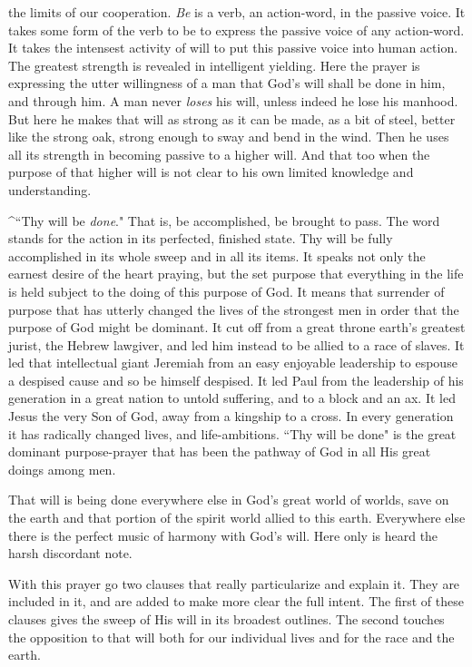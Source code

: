 the limits of our cooperation. \textit{Be} is a verb, an action-word, in the
passive voice. It takes some form of the verb to be to express the
passive voice of any action-word. It takes the intensest activity of will
to put this passive voice into human action. The greatest strength is
revealed in intelligent yielding. Here the prayer is expressing the utter
willingness of a man that God's will shall be done in him, and through
him. A man never \textit{loses} his will, unless indeed he lose his manhood. But
here he makes that will as strong as it can be made, as a bit of steel,
better like the strong oak, strong enough to sway and bend in the wind.
Then he uses all its strength in becoming passive to a higher will. And
that too when the purpose of that higher will is not clear to his own
limited knowledge and understanding.

^``Thy will be \textit{done}." That is, be accomplished, be brought to pass. The
word stands for the action in its perfected, finished state. Thy will be
fully accomplished in its whole sweep and in all its items. It speaks not
only the earnest desire of the heart praying, but the set purpose that
everything in the life is held subject to the doing of this purpose of
God. It means that surrender of purpose that has utterly changed the lives
of the strongest men in order that the purpose of God might be dominant.
It cut off from a great throne earth's greatest jurist, the Hebrew
lawgiver, and led him instead to be allied to a race of slaves. It led
that intellectual giant Jeremiah from an easy enjoyable leadership to
espouse a despised cause and so be himself despised. It led Paul from the
leadership of his generation in a great nation to untold suffering, and to
a block and an ax. It led Jesus the very Son of God, away from a kingship
to a cross. In every generation it has radically changed lives, and
life-ambitions. ``Thy will be done" is the great dominant purpose-prayer
that has been the pathway of God in all His great doings among men.

That will is being done everywhere else in God's great world of worlds,
save on the earth and that portion of the spirit world allied to this
earth. Everywhere else there is the perfect music of harmony with God's
will. Here only is heard the harsh discordant note.

With this prayer go two clauses that really particularize and explain it.
They are included in it, and are added to make more clear the full intent.
The first of these clauses gives the sweep of His will in its broadest
outlines. The second touches the opposition to that will both for our
individual lives and for the race and the earth.

